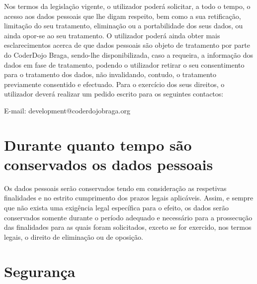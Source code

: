\documentclass[11pt]{article}
\begin{document}
Nos termos da legislação vigente, o utilizador poderá solicitar, a todo
o tempo, o acesso aos dados pessoais que lhe digam respeito, bem
como a sua retificação, limitação do seu tratamento, eliminação ou a
portabilidade dos seus dados, ou ainda opor-se ao seu tratamento.
O utilizador poderá ainda obter mais esclarecimentos acerca de que
dados pessoais são objeto de tratamento por parte do CoderDojo Braga,
sendo-lhe disponibilizada, caso a requeira, a informação dos dados
em fase de tratamento, podendo o utilizador retirar o seu
consentimento para o tratamento dos dados, não invalidando,
contudo, o tratamento previamente consentido e efectuado.
Para o exercício dos seus direitos, o utilizador deverá realizar um
pedido escrito para os seguintes contactos:

\begin{center}
E-mail: development@coderdojobraga.org
\end{center}

\section{Durante quanto tempo são conservados os dados
pessoais}
Os dados pessoais serão conservados tendo em consideração as
respetivas finalidades e no estrito cumprimento dos prazos legais
aplicáveis. Assim, e sempre que não exista uma exigência legal
específica para o efeito, os dados serão conservados somente
durante o período adequado e necessário para a prossecução das
finalidades para as quais foram solicitados, exceto se for exercido,
nos termos legais, o direito de eliminação ou de oposição.

\section{Segurança}
\end{document}
